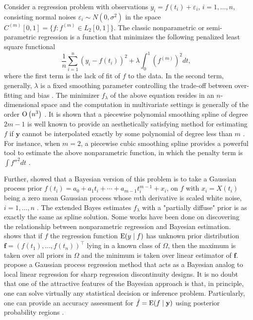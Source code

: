Consider a regression problem with observations $y_i = f(t_i)+\varepsilon_i$, $i=1,\ldots,n$, consisting \iid normal noises $\varepsilon_i\sim N(0,\sigma^2)$ in the space $C^{(m)}[0,1]=\{ f:f^{(m)}\in \mathit{L}_2[0,1] \}$. The classic nonparametric or semi-parametric regression is a function that minimizes the following penalized least square functional 
\begin{equation}\label{GaussianProcessGeneralObjective}
\frac{1}{n}\sum_{i=1}^{n}\left( y_i-f(t_i) \right)^2 + \lambda \int_{0}^{1} \left( f^{(m)}\right)^2dt, 
\end{equation}
where the first term is the lack of fit of $f$ to the data. In the second term, generally, $\lambda$ is a fixed smoothing parameter controlling the trade-off between over-fitting and bias \cite{esl2009}. The minimizer $f_\lambda$ of the above equation resides in an $n$-dimensional space and the computation in multivariate settings is generally of the order ${\rm O}\left(n^3\right)$ \cite{kim2004smoothing}. It is shown that a piecewise polynomial smoothing spline of degree $2m-1$ is well known to provide an aesthetically satisfying method for estimating $f$ if $\mathbf{y}$ cannot be interpolated exactly by some polynomial of degree less than $m$ \cite{schoenberg1964spline}. For instance, when $m=2$, a piecewise cubic smoothing spline provides a powerful tool to estimate the above nonparametric function, in which the penalty term is $\int f''^2dt$ \cite{hastie1990generalized}. 


Further, \cite{wahba1978improper} showed that a Bayesian version of this problem is to take a Gaussian process prior $f(t_i) = a_0+a_1t_i+\cdots + a_{m-1}t_i^{m-1} + x_i$, on $f$ with $x_i=X(t_i)$ being a zero mean Gaussian process whose $m$th derivative is scaled white noise, $i=1,\ldots,n$ \cite{speckman2003fully}. The extended Bayes estimates $f_\lambda$ with a "partially diffuse" prior is as exactly the same as spline solution. Some works have been done on discovering the relationship between nonparametric regression and Bayesian estimation. \cite{heckman1991minimax} shows that if $f$ the regression function $\mathrm{E}(y\mid f)$ has unknown prior distribution  $\mathbf{f}=(f(t_1),\ldots,f(t_n))^\top$ lying in a known class of $\Omega$, then the maximum is taken over all priors in $\Omega$ and the minimum is taken over linear estimator of $\mathbf{f}$. \cite{branson2017nonparametric} propose a Gaussian process regression method that acts as a Bayesian analog to local linear regression for sharp regression discontinuity designs. It is no doubt that one of the attractive features of the Bayesian approach is that, in principle, one can solve virtually any statistical decision or inference problem. Particularly, one can provide an accuracy assessment for $\hat{f}=\mathrm{E} (f\mid \mathbf{y})$ using posterior probability regions \cite{cox1993analysis}. 


